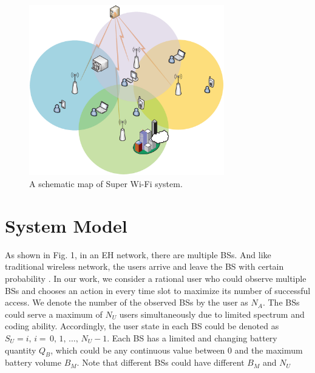 \documentclass[conference]{IEEEtran}
\begin{document}
\begin{figure}\label{fig1}
\centering
\includegraphics[width=8.5cm]{Fig1.eps}
\caption{A schematic map of Super Wi-Fi system.}
\end{figure}
\section{System Model}
As shown in Fig. 1, in an EH network, there are multiple BSs.
And like traditional wireless network, the users arrive and leave the BS with certain probability \cite{5}.
In our work, we consider a rational user who could observe multiple BSs and
chooses an action in every time slot to maximize its number of successful access.
We denote the number of the observed BSs by the user as \(N_A\).
The BSs could serve a maximum of \(N_U\) users simultaneously due to limited spectrum and coding ability.
Accordingly, the user state in each BS could be denoted as \(S_U = i,\, i = \,0,\,1,\,\ldots,\,N_U-1\).
Each BS has a limited and changing battery quantity \(Q_B\),
which could be any continuous value between \(0\) and the maximum battery volume \(B_M\).
Note that different BSs could have different \(B_M\) and \(N_U\)
\end{document}
